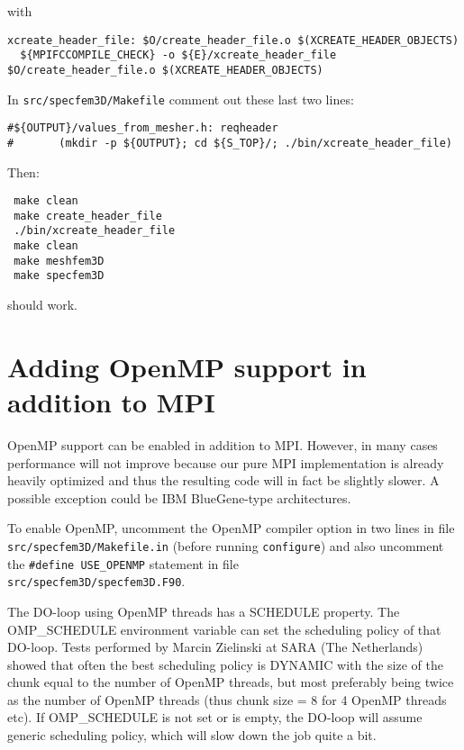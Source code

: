 \noindent
with

\begin{verbatim}
xcreate_header_file: $O/create_header_file.o $(XCREATE_HEADER_OBJECTS)
  ${MPIFCCOMPILE_CHECK} -o ${E}/xcreate_header_file $O/create_header_file.o $(XCREATE_HEADER_OBJECTS)
\end{verbatim}

\noindent
In \texttt{src/specfem3D/Makefile} comment out these last two lines:

\begin{verbatim}
#${OUTPUT}/values_from_mesher.h: reqheader
#       (mkdir -p ${OUTPUT}; cd ${S_TOP}/; ./bin/xcreate_header_file)
\end{verbatim}

\noindent
Then:

\begin{verbatim}
 make clean
 make create_header_file
 ./bin/xcreate_header_file
 make clean
 make meshfem3D
 make specfem3D
\end{verbatim}

\noindent
should work.

\section{Adding OpenMP support in addition to MPI}

OpenMP support can be enabled in addition to MPI. However, in many cases performance will not improve
because our pure MPI implementation is already heavily optimized and thus the resulting code will in fact
be slightly slower. A possible exception could be IBM BlueGene-type architectures.

To enable OpenMP, uncomment the OpenMP compiler option in two lines in file \texttt{src/specfem3D/Makefile.in}
(before running \texttt{configure}) and also uncomment the \texttt{\#define USE\_OPENMP} statement in file\\
\texttt{src/specfem3D/specfem3D.F90}.

The DO-loop using OpenMP threads has a SCHEDULE property. The OMP\_SCHEDULE
environment variable can set the scheduling policy of that DO-loop.
Tests performed by Marcin Zielinski at SARA (The Netherlands) showed that often
the best scheduling policy is DYNAMIC with the size of the chunk equal to the number of
OpenMP threads, but most preferably being twice as the number of
OpenMP threads (thus chunk size = 8 for 4 OpenMP threads etc).
If OMP\_SCHEDULE is not set or is empty, the DO-loop will assume generic
scheduling policy, which will slow down the job quite a bit.

